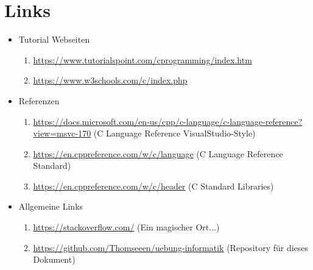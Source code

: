 \documentclass[]{scrartcl}
\begin{document}
\section{Links}
\begin{itemize}
	\item Tutorial Webseiten
	\begin{enumerate}[{1)}]
		\item \href{https://www.tutorialspoint.com/cprogramming/index.htm}{https://www.tutorialspoint.com/cprogramming/index.htm}
		\item \href{https://www.w3schools.com/c/index.php}{https://www.w3schools.com/c/index.php}
	\end{enumerate}

	\item Referenzen
	\begin{enumerate}[{1)}]
		\item \href{https://docs.microsoft.com/en-us/cpp/c-language/c-language-reference?view=msvc-170}{https://docs.microsoft.com/en-us/cpp/c-language/c-language-reference?view=msvc-170} (C Language Reference VisualStudio-Style)
		\item \href{https://en.cppreference.com/w/c/language}{https://en.cppreference.com/w/c/language} (C Language Reference Standard)
		\item \href{https://en.cppreference.com/w/c/header}{https://en.cppreference.com/w/c/header} (C Standard Libraries)
	\end{enumerate}

	\item Allgemeine Links
	\begin{enumerate}[{1)}]
		\item \href{https://stackoverflow.com/}{https://stackoverflow.com/} (Ein magischer Ort...)
		\item \href{https://github.com/Thomseeen/uebung-informatik}{https://github.com/Thomseeen/uebung-informatik} (Repository für dieses Dokument)
	\end{enumerate}
\end{itemize}
\end{document}
